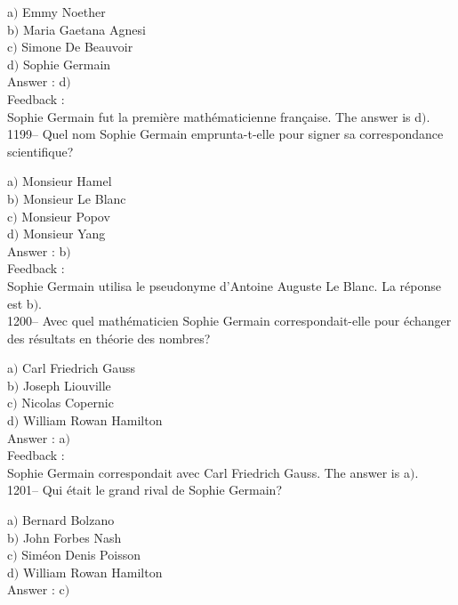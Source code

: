 \documentclass[letterpaper, 12pt]{article}
\begin{document}
a$)$ Emmy Noether \\
b$)$ Maria Gaetana Agnesi \\
c$)$ Simone De Beauvoir \\
d$)$ Sophie Germain\\

Answer : d$)$\\

Feedback : \\
Sophie Germain fut la premi\`ere math\'ematicienne fran\c caise.
The answer is d$)$.\\

1199-- Quel nom Sophie Germain emprunta-t-elle pour signer sa
correspondance scientifique?

a$)$ Monsieur Hamel \\
b$)$ Monsieur Le Blanc \\
c$)$ Monsieur Popov \\
d$)$ Monsieur Yang\\

Answer : b$)$\\

Feedback : \\
Sophie Germain utilisa le pseudonyme d'Antoine Auguste Le Blanc.  La
r\'eponse est b$)$.\\

1200-- Avec quel math\'ematicien Sophie Germain correspondait-elle
pour \'echanger des r\'esultats en th\'eorie des nombres?

a$)$ Carl Friedrich Gauss \\
b$)$ Joseph Liouville \\
c$)$ Nicolas Copernic \\
d$)$ William Rowan Hamilton\\

Answer : a$)$\\

Feedback : \\
Sophie Germain correspondait avec Carl Friedrich Gauss.
The answer is a$)$.\\

1201-- Qui \'etait le grand rival de Sophie Germain?

a$)$ Bernard Bolzano \\
b$)$ John Forbes Nash \\
c$)$ Sim\'eon Denis Poisson \\
d$)$ William Rowan Hamilton\\

Answer : c$)$\\
\end{document}
